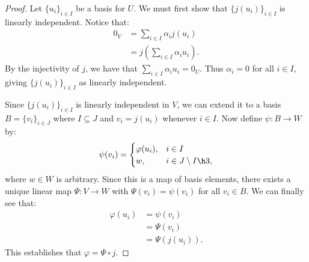         \begin{proof}
            Let $\{u_i\}_{i \in I}$ be a basis for $U$. We must first show that $\{j(u_i)\}_{i \in I}$ is linearly independent. Notice that:
                \begin{equation*}
                \begin{split}
                    0_V 
                    & = \sum_{i \in I}\alpha_i j(u_i) \\
                    & = j \left( \sum_{i \in I} \alpha_i u_i \right).
                \end{split}
                \end{equation*}
            By the injectivity of $j$, we have that $\sum_{i \in I}\alpha_i u_i = 0_U$. Thus $\alpha_i = 0$ for all $i \in I$, giving $\{j(u_i)\}_{i \in I}$ as linearly independent.

            Since $\{j(u_i)\}_{i \in I}$ is linearly independent in $V$, we can extend it to a basis \newline $B = \{v_i\}_{i \in J}$ where $I \subseteq J$ and $v_i = j(u_i)$ whenever $i \in I$. Now define $\psi:B\rightarrow W$ by:
                \begin{equation*}
                \begin{split}
                    \psi(v_i) = \begin{cases} \varphi(u_i), & i \in I \\ w, & i \in J\setminus I \h3, \end{cases}
                \end{split}
                \end{equation*}
            where $w \in W$ is arbitrary. Since this is a map of basis elements, there exists a unique linear map $\Psi:V \rightarrow W$ with $\Psi(v_i) = \psi(v_i)$ for all $v_i \in B$. We can finally see that:
                \begin{equation*}
                \begin{split}
                    \varphi(u_i)
                    & = \psi(v_i) \\
                    & = \Psi(v_i) \\
                    & = \Psi(j(u_i)).
                \end{split}
                \end{equation*}
            This establishes that $\varphi = \Psi \circ j$.
        \end{proof}

